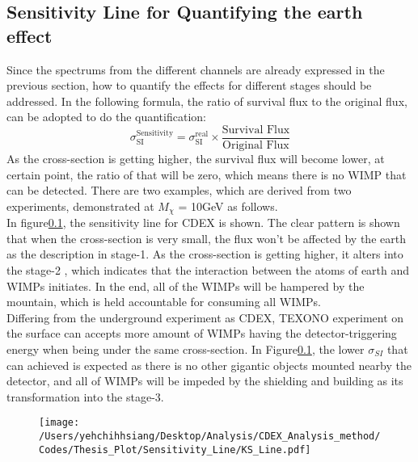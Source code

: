 \subsection{Sensitivity Line for Quantifying the earth effect}
Since the spectrums from the different channels are already expressed in the previous section, how to quantify the effects for different stages should be addressed. In the following formula, the ratio of survival flux to the original flux, can be adopted to do the quantification:\\
 	\begin{equation}
        \label{Interaction count modification}
	\sigma_{\text{SI}}^{\text{Sensitivity}} = \sigma_{\text{SI}}^{\text{real}}  \times \frac{ \text{Survival Flux}}{\text{Original Flux}}
        \end{equation}
As the cross-section is getting higher, the survival flux will become lower, at certain point, the ratio of that will be zero, which means there is no WIMP that can be detected. There are two examples, which are derived from two experiments, demonstrated at $M_{\chi}$ = 10GeV as follows.\\ 

In figure\ref{}, the sensitivity line for CDEX is shown. The clear pattern is shown that when the cross-section is very small, the flux won't be affected by the earth as the description in stage-1. As the cross-section is getting higher, it alters into the stage-2 , which indicates that the interaction between the atoms of earth and WIMPs initiates. In the end, all of the WIMPs will be hampered by the mountain, which is held accountable for consuming all WIMPs.\\ 

Differing from the underground experiment as CDEX, TEXONO experiment on the surface can accepts more amount of WIMPs having the detector-triggering energy when being under the same cross-section. In Figure\ref{}, the lower $\sigma_{SI}$ that can achieved is expected as there is no other gigantic objects mounted nearby the detector, and all of WIMPs will be impeded by the shielding and building as its transformation into the stage-3.
 
        \begin{figure}[h]
        \texttt{[image: /Users/yehchihhsiang/Desktop/Analysis/CDEX\_Analysis\_method/Codes/Thesis\_Plot/Sensitivity\_Line/KS\_Line.pdf]}
        \centering
        \caption{} \label{Vacuum-constrained WIMPs}
        \end{figure}

